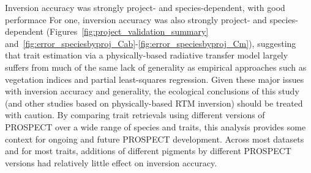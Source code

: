 Inversion accuracy was strongly project- and species-dependent, with good performace
For one, inversion accuracy was also strongly project- and species-dependent (Figures~\ref{fig:project_validation_summary} and~\ref{fig:error_speciesbyproj_Cab}-\ref{fig:error_speciesbyproj_Cm}), suggesting that trait estimation via a physically-based radiative transfer model largely suffers from much of the same lack of generality as empirical approaches such as vegetation indices and partial least-squares regression.
% 
% 
% 
Given these major issues with inversion accuracy and generality, the ecological conclusions of this study (and other studies based on physically-based RTM inversion) should be treated with caution.
% 
% 
% 
% 
% 
%
By comparing trait retrievals using different versions of PROSPECT over a wide range of species and traits, this analysis provides some context for ongoing and future PROSPECT development.
% 
% 
Across most datasets and for most traits, additions of different pigments by different PROSPECT versions had relatively little effect on inversion accuracy.
